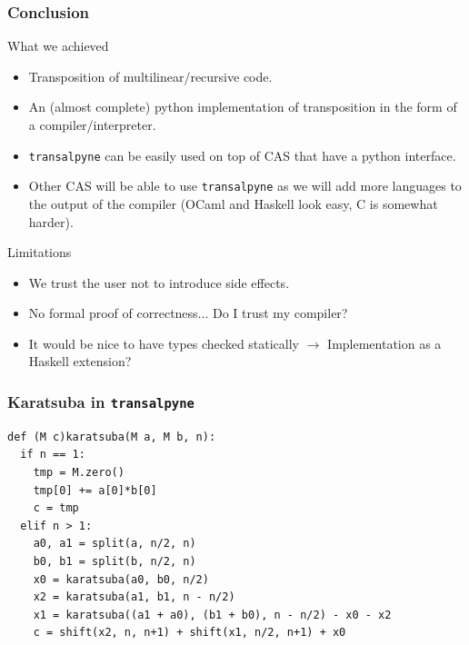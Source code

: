 \documentclass[10pt]{beamer}
\newcommand{\tALpy}{\texttt{transalpyne}}
\begin{document}
\begin{frame}
  \frametitle{Conclusion}
  
  \begin{block}{What we achieved}
    \begin{itemize}
    \item Transposition of multilinear/recursive code.
    \item An (almost complete) python implementation of transposition
      in the form of a compiler/interpreter.
    \item \tALpy{} can be easily used on top of CAS that have a python
      interface.
    \item Other CAS will be able to use \tALpy{} as we will add more
      languages to the output of the compiler (OCaml and Haskell look
      easy, C is somewhat harder).
    \end{itemize}
  \end{block}

  \begin{block}{Limitations}
    \begin{itemize}
    \item We trust the user not to introduce side effects.
    \item No formal proof of correctness... Do I trust my compiler?
    \item It would be nice to have types checked statically
      $\rightarrow$ Implementation as a Haskell extension?
    \end{itemize}
  \end{block}
\end{frame}


\lstset{language=python}

\begin{frame}[fragile]
  \frametitle{Karatsuba in \tALpy}

\begin{lstlisting}
def (M c)karatsuba(M a, M b, n):
  if n == 1:
    tmp = M.zero()
    tmp[0] += a[0]*b[0]
    c = tmp
  elif n > 1:
    a0, a1 = split(a, n/2, n)
    b0, b1 = split(b, n/2, n)
    x0 = karatsuba(a0, b0, n/2)
    x2 = karatsuba(a1, b1, n - n/2)
    x1 = karatsuba((a1 + a0), (b1 + b0), n - n/2) - x0 - x2
    c = shift(x2, n, n+1) + shift(x1, n/2, n+1) + x0
\end{lstlisting}
\end{frame}

\end{document}

